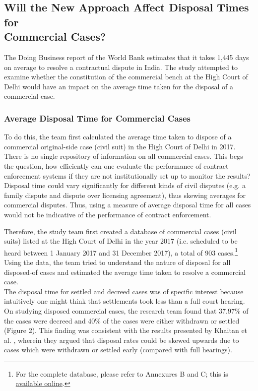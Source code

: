 \documentclass[a4paper, 12pt, twoside]{article}
\begin{document}
\subsection{Will the New Approach Affect Disposal Times for \\Commercial Cases?}

The Doing Business report of the World Bank estimates that it takes 1,445 days on average to resolve a contractual dispute in India. The study attempted to examine whether the constitution of the commercial bench at the High Court of Delhi would have an impact on the average time taken for the disposal of a commercial case. 

\subsubsection{Average Disposal Time for Commercial Cases}

To do this, the team first calculated the average time taken to dispose of a commercial original-side case (civil suit) in the High Court of Delhi in 2017. \\

There is no single repository of information on all commercial cases. This begs the question, how efficiently can one evaluate the performance of contract enforcement systems if they are not institutionally set up to monitor the results? \\

Disposal time could vary significantly for different kinds of civil disputes (e.g. a family dispute and dispute over licensing agreement), thus skewing averages for commercial disputes. Thus, using a measure of average disposal time for all cases would not be indicative of the performance of contract enforcement.

Therefore, the study team first created a database of commercial cases (civil suits) listed at the High Court of Delhi in the year 2017 (i.e. scheduled to be heard between 1 January 2017 and 31 December 2017), a total of 903 cases.\footnote{For the complete database, please refer to Annexures B and C; this is \href{http://bit.ly/2I7k8vH}{available online}.} Using the data, the team tried to understand the nature of disposal for all disposed-of cases and estimated the average time taken to resolve a commercial case. \\

The disposal time for settled and decreed cases was of specific interest because intuitively one might think that settlements took less than a full court hearing. On studying disposed commercial cases, the research team found that 37.97\% of the cases were decreed and 40\% of the cases were either withdrawn or settled (Figure 2). This finding was consistent with the results presented by Khaitan et al. \parencite{Vidhipaper}, wherein they argued that disposal rates could be skewed upwards due to cases which were withdrawn or settled early (compared with full hearings).
\end{document}
